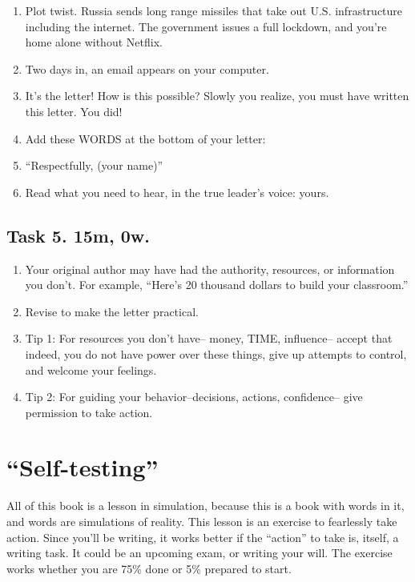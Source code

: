 \documentclass[
]{book}
\providecommand{\tightlist}{%
  \setlength{\itemsep}{0pt}\setlength{\parskip}{0pt}}
\begin{document}
\begin{enumerate}
\def\labelenumi{\arabic{enumi}.}
\setcounter{enumi}{4}
\tightlist
\item
  Plot twist. Russia sends long range missiles that take out U.S.
  infrastructure including the internet. The government issues a full
  lockdown, and you're home alone without Netflix.\\
\item
  Two days in, an email appears on your computer.
\item
  It's the letter! How is this possible? Slowly you realize, you must
  have written this letter. You did!
\item
  Add these WORDS at the bottom of your letter:
\item
  ``Respectfully, (your name)''
\item
  Read what you need to hear, in the true leader's voice: yours.
\end{enumerate}

\section{Task 5. 15m, 0w.}\label{task-5.-15m-0w.}

\begin{enumerate}
\def\labelenumi{\arabic{enumi}.}
\setcounter{enumi}{10}
\tightlist
\item
  Your original author may have had the authority, resources, or
  information you don't. For example, ``Here's 20 thousand dollars to
  build your classroom.''
\item
  Revise to make the letter practical.
\item
  Tip 1: For resources you don't have-- money, TIME, influence--
  accept that indeed, you do not have power over these things, give up
  attempts to control, and welcome your feelings.
\item
  Tip 2: For guiding your behavior--decisions, actions, confidence--
  give permission to take action.
\end{enumerate}

\chapter{``Self-testing''}\label{self-testing}

All of this book is a lesson in simulation,
because this is a book with words in it,
and words are simulations of reality.
This lesson is an exercise to fearlessly
take action. Since you'll be writing,
it works better if the ``action'' to take is,
itself, a writing task.
It could be an upcoming exam, or writing your will.
The exercise works whether you are
75\% done or 5\% prepared to start.
\end{document}
